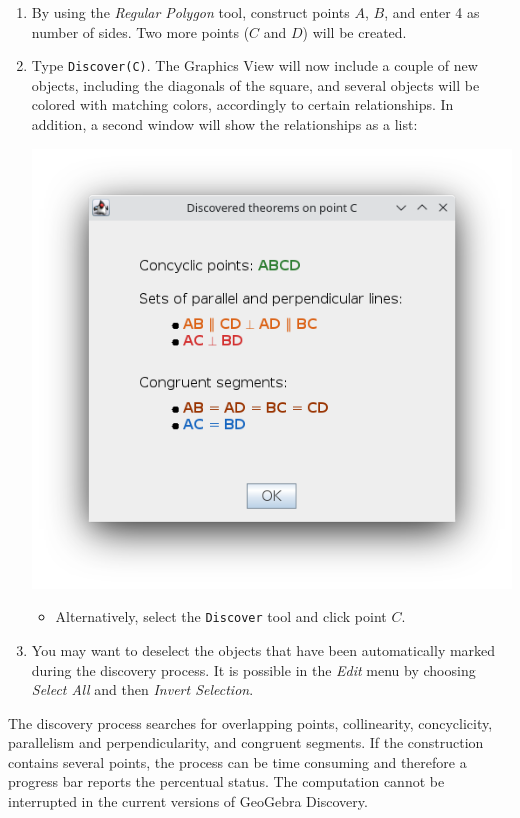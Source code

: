 \documentclass{article}
\begin{document}
\begin{enumerate}
    \item By using the \textit{Regular Polygon} tool, construct points $A$, $B$, and enter 4 as number of sides.
    Two more points ($C$ and $D$) will be created.
    \item Type \texttt{Discover(C)}. The Graphics View will now include a couple of new objects, including the diagonals of the square, and several objects will be colored with matching colors, accordingly to certain relationships. In addition, a second window will show the relationships as a list:
    \begin{center}
    \includegraphics[scale=0.5]{Discover-example-2}
    \end{center}
    \begin{itemize}
        \item Alternatively, select the \texttt{Discover} tool  and click point $C$.
    \end{itemize}
    \item You may want to deselect the objects that have been automatically marked during the discovery process. It is possible in the \textit{Edit} menu by choosing \textit{Select All} and then \textit{Invert Selection}.
\end{enumerate}

The discovery process searches for overlapping points, collinearity, concyclicity, parallelism and perpendicularity, and congruent segments.
If the construction contains several points, the process can be time consuming and therefore a progress bar reports the percentual status. The computation cannot be interrupted in the current versions of GeoGebra Discovery.
\end{document}
